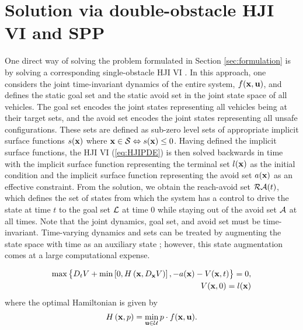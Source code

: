 \section{Solution via double-obstacle HJI VI and SPP\label{sec:solution}}
One direct way of solving the problem formulated in Section \ref{sec:formulation} is by solving a corresponding single-obstacle HJI VI \cite{mitchell05,bokanowski10}. In this approach, one considers the joint time-invariant dynamics of the entire system, $f(\mathbf{x},\mathbf{u})$, and defines the static goal set and the static avoid set in the joint state space of all vehicles. The goal set encodes the joint states representing all vehicles being at their target sets, and the avoid set encodes the joint states representing all unsafe configurations. These sets are defined as sub-zero level sets of appropriate implicit surface functions $s(\mathbf{x})$ where $\mathbf{x}\in\mathcal{S} \Leftrightarrow s(\mathbf{x})\le 0$. Having defined the implicit surface functions, the HJI VI (\ref{eq:HJIPDE}) is then solved backwards in time with the implicit surface function representing the terminal set $l(\mathbf{x})$ as the initial condition and the implicit surface function representing the avoid set $a(\mathbf{x})$ as an effective constraint. From the solution, we obtain the reach-avoid set $\mathcal{RA}(t)$, which defines the set of states from which the system has a control to drive the state at time $t$ to the goal set $\mathcal{L}$ at time $0$ while staying out of the avoid set $\mathcal{A}$ at all times. Note that the joint dynamics, goal set, and avoid set must be time-invariant. Time-varying dynamics and sets can be treated by augmenting the state space with time as an auxiliary state \cite{bokanowski11}; however, this state augmentation comes at a large computational expense.

\begin{equation}
\begin{aligned}
	\label{eq:HJIPDE}
	\max\big\{D_tV + \min \left[0, H\left(\mathbf{x},D_{\mathbf{x}}V\right)\right], -a(\mathbf{x})-V(\mathbf{x},t) \big\}= 0,\\
V(\mathbf{x},0) = l(\mathbf{x})	 
\end{aligned}
\end{equation}
\noindent where the optimal Hamiltonian is given by
\begin{equation*}
H\left(\mathbf{x},p\right) = \min_{\mathbf{u} \in \mathcal{U}} p \cdot f(\mathbf{x},\mathbf{u}).
\end{equation*}

